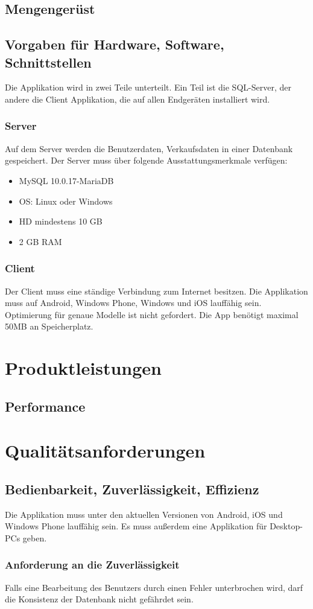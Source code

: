 \documentclass[a4paper,12pt,oneside]{scrartcl}
\begin{document}
\subsection{Mengengerüst}
\subsection{Vorgaben für Hardware, Software, Schnittstellen}
Die Applikation wird in zwei Teile unterteilt. Ein Teil ist die SQL-Server, der andere die Client Applikation, die auf allen Endgeräten installiert wird.

\subsubsection*{Server}
Auf dem Server werden die Benutzerdaten, Verkaufsdaten in einer Datenbank gespeichert.
Der Server muss über folgende Ausstattungsmerkmale verfügen:
\begin{itemize}
	\item MySQL 10.0.17-MariaDB
	\item OS: Linux oder Windows
	\item HD mindestens 10 GB
	\item 2 GB RAM
\end{itemize}

\subsubsection*{Client}
Der Client muss eine ständige Verbindung zum Internet besitzen. Die Applikation muss auf Android, Windows Phone, Windows und iOS lauffähig sein. Optimierung für genaue Modelle ist nicht gefordert. Die App benötigt maximal 50MB an Speicherplatz. 


\section{Produktleistungen}
\subsection{Performance}


\section{Qualitätsanforderungen}
\subsection{Bedienbarkeit, Zuverlässigkeit, Effizienz}
Die Applikation muss unter den aktuellen Versionen von Android, iOS und Windows Phone lauffähig sein. Es muss außerdem eine Applikation für Desktop-PCs geben.

\subsubsection*{Anforderung an die Zuverlässigkeit}
Falls eine Bearbeitung des Benutzers durch einen Fehler unterbrochen wird, darf die Konsistenz der Datenbank nicht gefährdet sein.
\end{document}
